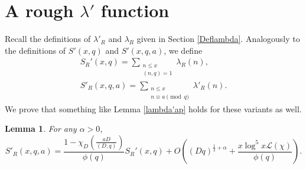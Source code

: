 \documentclass{amsart}
\newtheorem{lemma}[theorem]{Lemma}
\begin{document}
\section{A rough $\lambda'$ function}\label{lambdaR}

Recall the definitions of $\lambda'_R$ and $\lambda_R$ given in Section \ref{Deflambda}.  Analogously to the definitions of $S'(x,q)$ and $S'(x,q,a)$, we define
\begin{gather*}
S_R'(x,q)=\sum_{\substack{n\leq x \\(n,q)=1}}\lambda_R(n),\\
S'_R(x,q,a)=\sum_{\substack{n\leq x \\n\equiv a \pmod q}}\lambda'_R(n).
\end{gather*}
We prove that something like Lemma \ref{lambda'ap} holds for these variants as well.
\begin{lemma}\label{DR}
For any $\alpha>0$,
$$S'_R(x,q,a)=\frac{1-\chi_D\left(\frac{aD}{(D,q)}\right)}{\phi(q)}S_R'(x,q)+O\left((Dq)^{\frac 12+\alpha}+\frac{x\log^5 x\mathcal L(\chi)}{\phi(q)}\right).$$
\end{lemma}
\end{document}
